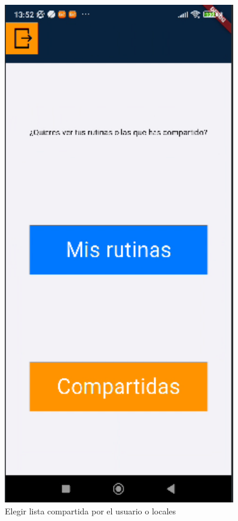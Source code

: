 \begin{figure}[H]
   \centering
   \begin{minipage}{0.45\textwidth}
      \centering
      \includegraphics[width=0.9\textwidth]{pantallas/rutinaMiaOComp.png}
      \caption{Elegir lista compartida por el usuario o locales}

\end{minipage}
\end{figure}
